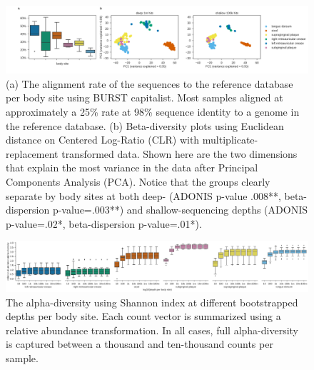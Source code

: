 \begin{figure}[hbt]
    \centering
    \includegraphics[width=0.8\linewidth]{fig/hmp_beta.png}
    \caption{
        (a) The alignment rate of the sequences to the reference database per body site using BURST capitalist. Most samples aligned at approximately a 25\% rate at 98\% sequence identity to a genome in the reference database. (b) Beta-diversity plots using Euclidean distance on Centered Log-Ratio (CLR) with multiplicate-replacement transformed data. Shown here are the two dimensions that explain the most variance in the data after Principal Components Analysis (PCA). Notice that the groups clearly separate by body sites at both deep- (ADONIS p-value .008**, beta-dispersion p-value=.003**) and shallow-sequencing depths (ADONIS p-value=.02*, beta-dispersion p-value=.01*). 
    }
    \label{fig:hmp_beta}
\end{figure}

\begin{figure}[hbt]
    \centering
    \includegraphics[width=0.8\linewidth]{fig/hmp_alpha.png}
    \caption{
        The alpha-diversity using Shannon index at different bootstrapped depths per body site. Each count vector is summarized using a relative abundance transformation. In all cases, full alpha-diversity is captured between a thousand and ten-thousand counts per sample.
     }
     \label{fig:hmp_alpha}
\end{figure}


